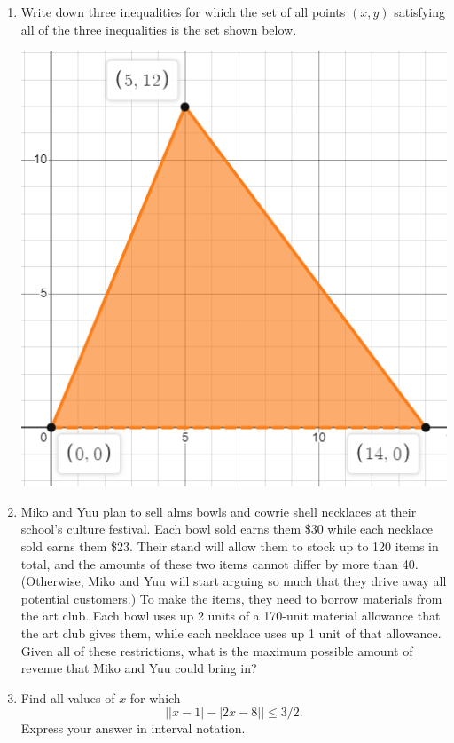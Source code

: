 \begin{enumerate}[resume]
\item Write down three inequalities for which the set of all points $(x,y)$ satisfying all of the three inequalities is the set shown below.
\begin{center}
\includegraphics[scale=0.3]{lin-ineq-triangle.png}
\end{center}
\item Miko and Yuu plan to sell alms bowls and cowrie shell necklaces at their school's culture festival. Each bowl sold earns them \$30 while each necklace sold earns them \$23. Their stand will allow them to stock up to 120 items in total, and the amounts of these two items cannot differ by more than 40. (Otherwise, Miko and Yuu will start arguing so much that they drive away all potential customers.) To make the items, they need to borrow materials from the art club. Each bowl uses up 2 units of a 170-unit material allowance that the art club gives them, while each necklace uses up 1 unit of that allowance. Given all of these restrictions, what is the maximum possible amount of revenue that Miko and Yuu could bring in?
\item Find all values of $x$ for which
\begin{equation*}
\lvert\lvert x - 1\rvert - \lvert 2x - 8\rvert\rvert\leq 3/2.
\end{equation*}
Express your answer in interval notation.
\end{enumerate}


